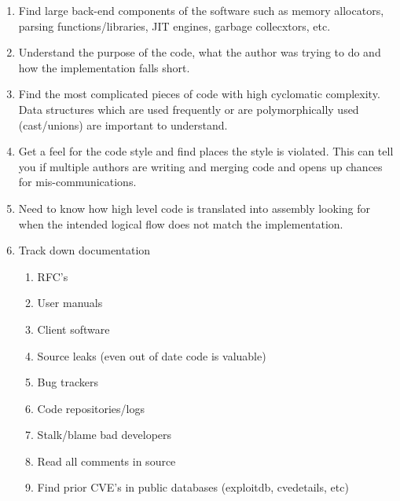 \documentclass[12pt]{Training}
\begin{document}
\begin{enumerate}
\begin{enumerate}
		\item Find large back-end components of the software such as memory allocators, parsing functions/libraries, JIT engines, garbage collecxtors, etc.
		\item Understand the purpose of the code, what the author was trying to do and how the implementation falls short.
		\item Find the most complicated pieces of code with high cyclomatic complexity. Data structures which are used frequently or are polymorphically used (cast/unions) are important to understand.
		\item Get a feel for the code style and find places the style is violated. This can tell you if multiple authors are writing and merging code and opens up chances for mis-communications.
		\item Need to know how high level code is translated into assembly looking for when the intended logical flow does not match the implementation.
		\item Track down documentation
			\begin{enumerate}
				\item RFC's
				\item User manuals
				\item Client software
				\item Source leaks (even out of date code is valuable)
				\item Bug trackers
				\item Code repositories/logs
				\item Stalk/blame bad developers
				\item Read all comments in source
				\item Find prior CVE's in public databases (exploitdb, cvedetails, etc)
			\end{enumerate}
	\end{enumerate}
\end{enumerate}
\end{document}

